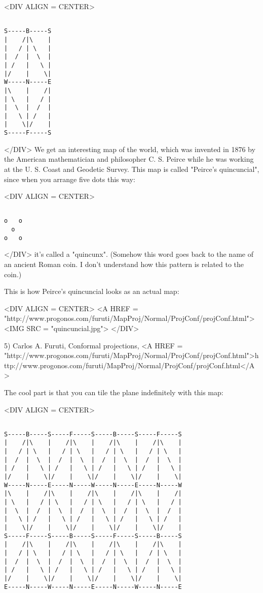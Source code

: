 <DIV ALIGN = CENTER>

\begin{verbatim}

S-----B-----S
|    /|\    |
|   / | \   |
|  /  |  \  |
| /   |   \ |
|/    |    \|
W-----N-----E
|\    |    /|
| \   |   / |
|  \  |  /  |
|   \ | /   |
|    \|/    |
S-----F-----S
\end{verbatim}
    
</DIV>
We get an interesting map of the world, which was invented in 1876
by the American mathematician and philosopher C. S. Peirce while he
was working at the U. S. Coast and Geodetic Survey.   This map is 
called "Peirce's quincuncial", since when you arrange five dots this 
way:

<DIV ALIGN = CENTER>

\begin{verbatim}

o   o
  o  
o   o
\end{verbatim}
    
</DIV>
it's called a "quincunx".  (Somehow this word
goes back to the name of an ancient Roman coin.  I don't understand 
how this pattern is related to the coin.)

This is how Peirce's quincuncial looks as an actual map:

<DIV ALIGN = CENTER>
<A HREF = 
"http://www.progonos.com/furuti/MapProj/Normal/ProjConf/projConf.html">
<IMG SRC = "quincuncial.jpg">
</DIV>

5) Carlos A. Furuti, Conformal projections, 
<A HREF = "http://www.progonos.com/furuti/MapProj/Normal/ProjConf/projConf.html">http://www.progonos.com/furuti/MapProj/Normal/ProjConf/projConf.html</A>

The cool part is that you can tile the plane indefinitely with 
this map:

<DIV ALIGN = CENTER>

\begin{verbatim}

S-----B-----S-----F-----S-----B-----S-----F-----S
|    /|\    |    /|\    |    /|\    |    /|\    |
|   / | \   |   / | \   |   / | \   |   / | \   |
|  /  |  \  |  /  |  \  |  /  |  \  |  /  |  \  |
| /   |   \ | /   |   \ | /   |   \ | /   |   \ |
|/    |    \|/    |    \|/    |    \|/    |    \|
W-----N-----E-----N-----W-----N-----E-----N-----W
|\    |    /|\    |    /|\    |    /|\    |    /|
| \   |   / | \   |   / | \   |   / | \   |   / |
|  \  |  /  |  \  |  /  |  \  |  /  |  \  |  /  |
|   \ | /   |   \ | /   |   \ | /   |   \ | /   |
|    \|/    |    \|/    |    \|/    |    \|/    |
S-----F-----S-----B-----S-----F-----S-----B-----S
|    /|\    |    /|\    |    /|\    |    /|\    |
|   / | \   |   / | \   |   / | \   |   / | \   |
|  /  |  \  |  /  |  \  |  /  |  \  |  /  |  \  |
| /   |   \ | /   |   \ | /   |   \ | /   |   \ |
|/    |    \|/    |    \|/    |    \|/    |    \|
E-----N-----W-----N-----E-----N-----W-----N-----E
\end{verbatim}
    

